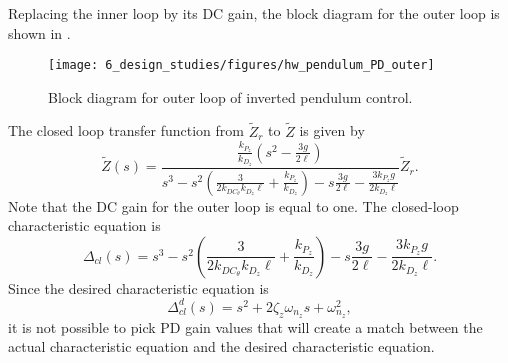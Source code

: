 Replacing the inner loop by its DC gain, the block diagram for the outer loop is shown in .
%
\begin{figure}[htbp]
   	\centering
   	\texttt{[image: 6\_design\_studies/figures/hw\_pendulum\_PD\_outer]} 
   	\caption{Block diagram for outer loop of inverted pendulum control.}
   	\label{fig:hw_pendulum_PD_outer}
\end{figure}
%
The closed loop transfer function from $\tilde{Z}_r$ to $\tilde{Z}$ is given by
\[
\tilde{Z}(s) = \frac{\frac{k_{P_z}}{k_{D_z}}(s^2-\frac{3g}{2\ell})}{s^3-s^2 (\frac{3}{2 k_{DC_\theta} k_{D_z} \ell} + \frac{ k_{P_z}}{k_{D_z}}) - s \frac{3 g}{2 \ell} - \frac{3 k_{P_z} g}{2 k_{D_z} \ell}} \tilde{Z}_r.
\]
Note that the DC gain for the outer loop is equal to one.
The closed-loop characteristic equation is 
\[
\Delta_{cl}(s) = s^3-s^2 (\frac{3}{2 k_{DC_\theta} k_{D_z} \ell} + \frac{ k_{P_z}}{k_{D_z}}) - s \frac{3 g}{2 \ell} - \frac{3 k_{P_z} g}{2 k_{D_z} \ell}.
\]
Since the desired characteristic equation is 
\begin{equation}\label{eq:delta_cl_d_pendulum_outer}
\Delta_{cl}^d(s) = s^2 + 2\zeta_z\omega_{n_z}s + \omega_{n_z}^2,
\end{equation}
it is not possible to pick PD gain values that will create a match between the actual characteristic equation and the desired characteristic equation.  

